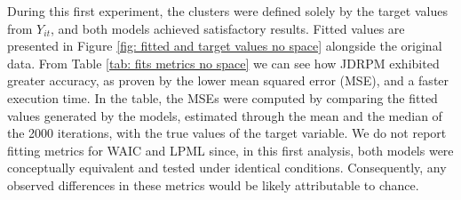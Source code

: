 \documentclass[12pt,	%
	a4paper,		%
	twoside,		%
	openright,		%
	titlepage,%
	]{book}
\theoremstyle{definition}
\begin{document}
During this first experiment, the clusters were defined solely by the target values from $Y_{it}$, and both models achieved satisfactory results. Fitted values are presented in Figure \ref{fig: fitted and target values no space} alongside the original data. From Table \ref{tab: fits metrics no space} we can see how JDRPM exhibited greater accuracy, as proven by the lower mean squared error (MSE), and a faster execution time. In the table, the MSEs were computed by comparing the fitted values generated by the models, estimated through the mean and the median of the 2000 iterations, with the true values of the target variable. We do not report fitting metrics for WAIC and LPML since, in this first analysis, both models were conceptually equivalent and tested under identical conditions. Consequently, any observed differences in these metrics would be likely attributable to chance.

\end{document}
